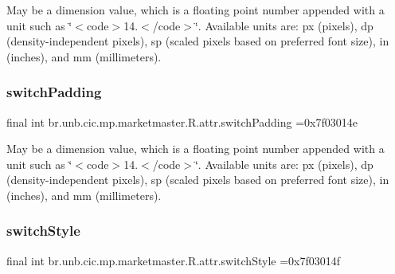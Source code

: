 May be a dimension value, which is a floating point number appended with a unit such as \char`\"{}$<$code$>$14.\+5sp$<$/code$>$\char`\"{}. Available units are\+: px (pixels), dp (density-\/independent pixels), sp (scaled pixels based on preferred font size), in (inches), and mm (millimeters). \mbox{\label{classbr_1_1unb_1_1cic_1_1mp_1_1marketmaster_1_1R_1_1attr_ac69e105a0ec078d83dccf2909e5686c5}} 
\subsubsection{\texorpdfstring{switch\+Padding}{switchPadding}}
{\footnotesize\ttfamily final int br.\+unb.\+cic.\+mp.\+marketmaster.\+R.\+attr.\+switch\+Padding =0x7f03014e\hspace{0.3cm}{\ttfamily [static]}}

May be a dimension value, which is a floating point number appended with a unit such as \char`\"{}$<$code$>$14.\+5sp$<$/code$>$\char`\"{}. Available units are\+: px (pixels), dp (density-\/independent pixels), sp (scaled pixels based on preferred font size), in (inches), and mm (millimeters). \mbox{\label{classbr_1_1unb_1_1cic_1_1mp_1_1marketmaster_1_1R_1_1attr_ab0db5f9323af2c4160768b9db9dff201}} 
\subsubsection{\texorpdfstring{switch\+Style}{switchStyle}}
{\footnotesize\ttfamily final int br.\+unb.\+cic.\+mp.\+marketmaster.\+R.\+attr.\+switch\+Style =0x7f03014f\hspace{0.3cm}{\ttfamily [static]}}

